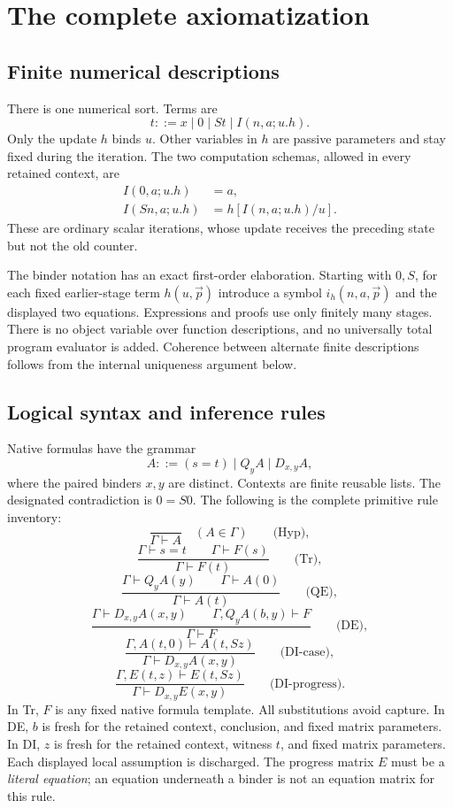 \documentclass[11pt,letterpaper]{article}
\theoremstyle{definition}\newtheorem{definition}[theorem]{Definition}
\theoremstyle{remark}\newtheorem{remark}[theorem]{Remark}
\begin{document}
\section{The complete axiomatization}
\label{sec:complete-theory}

\subsection{Finite numerical descriptions}

There is one numerical sort. Terms are
\[
                 t::=x\mid 0\mid St\mid I(n,a;u.h).
\]
Only the update $h$ binds $u$. Other variables in $h$ are passive
parameters and stay fixed during the iteration. The two computation
schemas, allowed in every retained context, are
\begin{align}
 I(0,a;u.h)&=a,\tag{I0}\label{up:i0}\\
 I(Sn,a;u.h)&=h[I(n,a;u.h)/u].\tag{IS}\label{up:is}
\end{align}
These are ordinary scalar iterations, whose update receives the preceding
state but not the old counter.

The binder notation has an exact first-order elaboration. Starting with
$0,S$, for each fixed earlier-stage term $h(u,\vec p)$ introduce a symbol
$i_h(n,a,\vec p)$ and the displayed two equations. Expressions and proofs
use only finitely many stages. There is no object variable over function
descriptions, and no universally total program evaluator is added.
Coherence between alternate finite descriptions follows from the internal
uniqueness argument below.

\subsection{Logical syntax and inference rules}

Native formulas have the grammar
\[
            A::=(s=t)\mid Q_yA\mid D_{x,y}A,
\]
where the paired binders $x,y$ are distinct. Contexts are finite reusable
lists. The designated contradiction is $0=S0$.
The following is the complete primitive rule inventory:
\[
 \frac{}{\Gamma\vdash A}\quad(A\in\Gamma)\qquad\text{(Hyp)},
\]
\[
 \frac{\Gamma\vdash s=t\qquad\Gamma\vdash F(s)}
      {\Gamma\vdash F(t)}\qquad\text{(Tr)},
\]
\[
 \frac{\Gamma\vdash Q_yA(y)\qquad\Gamma\vdash A(0)}
      {\Gamma\vdash A(t)}\qquad\text{(QE)},
\]
\[
 \frac{\Gamma\vdash D_{x,y}A(x,y)\qquad
       \Gamma,Q_yA(b,y)\vdash F}
      {\Gamma\vdash F}\qquad\text{(DE)},
\]
\[
 \frac{\Gamma,A(t,0)\vdash A(t,Sz)}
      {\Gamma\vdash D_{x,y}A(x,y)}\qquad\text{(DI-case)},
\]
\[
 \frac{\Gamma,E(t,z)\vdash E(t,Sz)}
      {\Gamma\vdash D_{x,y}E(x,y)}\qquad\text{(DI-progress)}.
\]
In Tr, $F$ is any fixed native formula template. All substitutions avoid
capture. In DE, $b$ is fresh for the retained context, conclusion, and
fixed matrix parameters. In DI, $z$ is fresh for the retained context,
witness $t$, and fixed matrix parameters. Each displayed local assumption
is discharged. The progress matrix $E$ must be a \emph{literal equation};
an equation underneath a binder is not an equation matrix for this rule.
\end{document}
